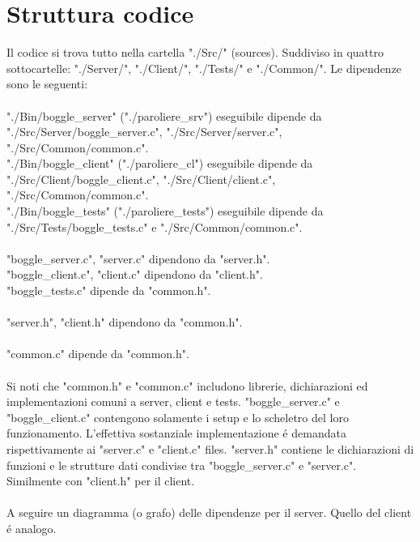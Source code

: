 \chapter{Struttura codice}

Il codice si trova tutto nella cartella "./Src/" (sources). Suddiviso in quattro sottocartelle: "./Server/", "./Client/", "./Tests/" e "./Common/". Le dipendenze sono le seguenti:
\\
\\
"./Bin/boggle\_server" ("./paroliere\_srv") eseguibile dipende da "./Src/Server/boggle\_server.c", "./Src/Server/server.c", "./Src/Common/common.c".
\\
"./Bin/boggle\_client" ("./paroliere\_cl") eseguibile dipende da "./Src/Client/boggle\_client.c", "./Src/Client/client.c", "./Src/Common/common.c".
\\
"./Bin/boggle\_tests" ("./paroliere\_tests") eseguibile dipende da "./Src/Tests/boggle\_tests.c" e "./Src/Common/common.c".
\\
\\
"boggle\_server.c", "server.c" dipendono da "server.h".
\\
"boggle\_client.c", "client.c" dipendono da "client.h".
\\
"boggle\_tests.c" dipende da "common.h".
\\
\\
"server.h", "client.h" dipendono da "common.h".
\\
\\
"common.c" dipende da "common.h".
\\
\\
Si noti che "common.h" e "common.c" includono librerie, dichiarazioni ed implementazioni comuni a server, client e tests. "boggle\_server.c" e "boggle\_client.c" contengono solamente i setup e lo scheletro del loro funzionamento. L'effettiva sostanziale implementazione \'e demandata rispettivamente ai "server.c" e "client.c" files. "server.h" contiene le dichiarazioni di funzioni e le strutture dati condivise tra "boggle\_server.c" e "server.c". Similmente con "client.h" per il client.
\\
\\
A seguire un diagramma (o grafo) delle dipendenze per il server. Quello del client \'e analogo.


\usetikzlibrary{shapes,arrows,positioning}

